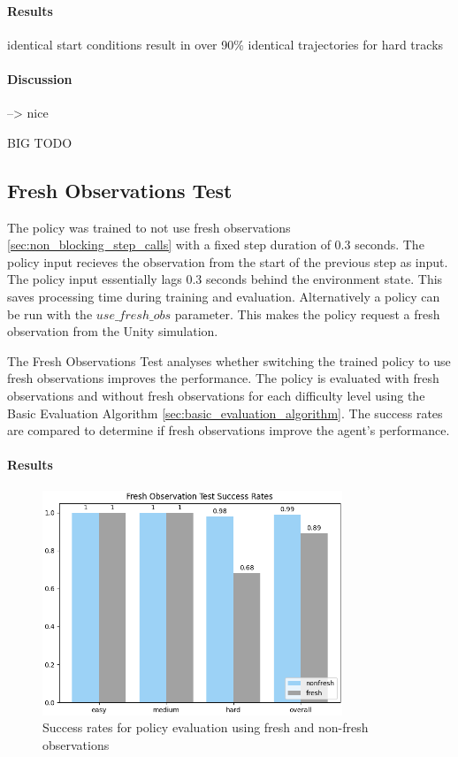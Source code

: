 \paragraph{Results}

identical start conditions result in over 90\% identical trajectories for hard tracks

\paragraph{Discussion}

--> nice

BIG TODO


\subsection{Fresh Observations Test}

The policy was trained to not use fresh observations \ref{sec:non_blocking_step_calls} with a fixed step duration of 0.3 seconds. The policy input recieves the observation from the start of the previous step as input. The policy input essentially lags 0.3 seconds behind the environment state. This saves processing time during training and evaluation. Alternatively a policy can be run with the $use\_fresh\_obs$ parameter. This makes the policy request a fresh observation from the Unity simulation.

The Fresh Observations Test analyses whether switching the trained policy to use fresh observations improves the performance. The policy is evaluated with fresh observations and without fresh observations for each difficulty level using the Basic Evaluation Algorithm \ref{sec:basic_evaluation_algorithm}. The success rates are compared to determine if fresh observations improve the agent's performance.

\paragraph{Results}

\begin{figure}
    \centering
    \includegraphics[width=0.8\textwidth]{Bilder/notebook_images/hardDistanceMixedLight_eval_freshNonFresh_success_rates_barplot.png}
    \caption{Success rates for policy evaluation using fresh and non-fresh observations}
    \label{fig:fresh_observations_test_result}
\end{figure}

